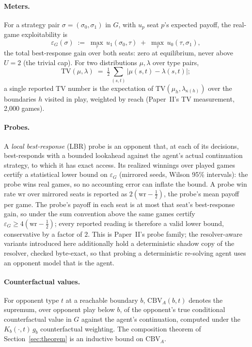 \documentclass[11pt]{article}
\theoremstyle{plain}
\theoremstyle{definition}
\theoremstyle{remark}
\newcommand{\game}{\ensuremath{G}}
\newcommand{\epsG}{\ensuremath{\varepsilon_{\game}}}
\newcommand{\CBV}{\mathrm{CBV}}
\begin{document}
\paragraph{Meters.} For a strategy pair $\sigma=(\sigma_0,\sigma_1)$
in $\game$, with $u_p$ seat $p$'s expected payoff, the real-game
exploitability is
\[
\epsG(\sigma) \;:=\; \max_{\tau}\, u_1(\sigma_0,\tau)
\;+\; \max_{\tau}\, u_0(\tau,\sigma_1),
\]
the total best-response gain over both seats: zero at equilibrium,
never above $U=2$ (the trivial cap). For two distributions
$\mu,\lambda$ over type pairs,
\[
\mathrm{TV}(\mu,\lambda) \;=\; \tfrac12 \sum_{(s,t)}
\bigl|\mu(s,t)-\lambda(s,t)\bigr| ;
\]
a single reported TV number is the expectation of
$\mathrm{TV}(\mu_h,\lambda_{\kappa(h)})$ over the boundaries $h$
visited in play, weighted by reach (Paper~II's TV measurement,
2{,}000 games).

\paragraph{Probes.} A \emph{local best-response} (LBR) probe is an
opponent that, at each of its decisions, best-responds with a bounded
lookahead against the agent's actual continuation strategy, to which
it has exact access. Its realized winnings over played games certify a
statistical lower bound on $\epsG$ (mirrored seeds, Wilson 95\%
intervals): the probe wins real games, so no accounting error can
inflate the bound. A probe win rate $\mathrm{wr}$ over mirrored seats is
reported as $2(\mathrm{wr}-\tfrac12)$, the probe's mean payoff per game.
The probe's payoff in each seat is at most that seat's best-response
gain, so under the sum convention above the same games certify
$\epsG \ge 4(\mathrm{wr}-\tfrac12)$; every reported reading is
therefore a valid lower bound, conservative by a factor of $2$. This is Paper~II's probe family; the
resolver-aware variants introduced here additionally hold a
deterministic shadow copy of the resolver, checked byte-exact, so that
probing a deterministic re-solving agent uses an opponent model that
is the agent.

\paragraph{Counterfactual values.} For opponent type $t$ at a
reachable boundary $b$, $\CBV_A(b,t)$ denotes the supremum, over
opponent play below $b$, of the opponent's true conditional
counterfactual value in $\game$ against the agent's continuation,
computed under the $K_b(\cdot,t)\,g_b$ counterfactual weighting. The
composition theorem of Section~\ref{sec:theorem} is an inductive bound
on $\CBV_A$.
\end{document}
